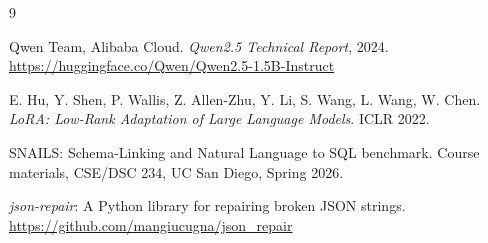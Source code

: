 \documentclass[11pt,letterpaper]{article}
\begin{document}
\begin{thebibliography}{9}

Qwen Team, Alibaba Cloud.
\textit{Qwen2.5 Technical Report}, 2024.
\url{https://huggingface.co/Qwen/Qwen2.5-1.5B-Instruct}

E. Hu, Y. Shen, P. Wallis, Z. Allen-Zhu, Y. Li, S. Wang, L. Wang, W. Chen.
\textit{LoRA: Low-Rank Adaptation of Large Language Models}.
ICLR 2022.

SNAILS: Schema-Linking and Natural Language to SQL benchmark.
Course materials, CSE/DSC 234, UC San Diego, Spring 2026.

\textit{json-repair}: A Python library for repairing broken JSON strings.
\url{https://github.com/mangiucugna/json_repair}

\end{thebibliography}
\end{document}
